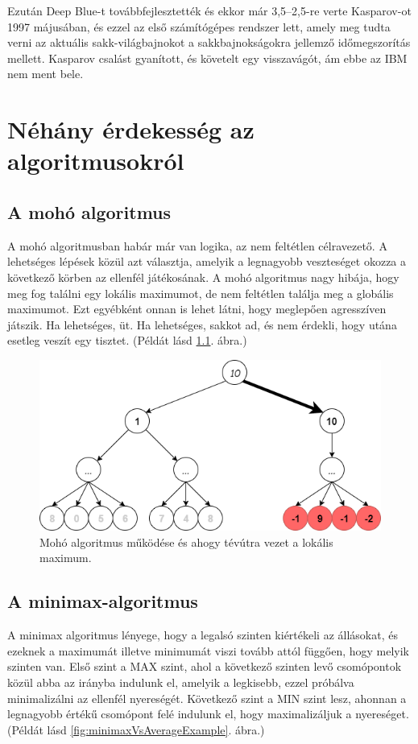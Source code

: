 \documentclass[twoside, a4paper, 12pt]{book}
\begin{document}
Ezután Deep Blue-t továbbfejlesztették és ekkor már 3,5–2,5-re verte Kasparov-ot 1997 májusában, és ezzel az első számítógépes rendszer lett, amely meg tudta verni az aktuális sakk-világbajnokot a sakkbajnokságokra jellemző időmegszorítás mellett. Kasparov csalást gyanított, és követelt egy visszavágót, ám ebbe az IBM nem ment bele. \cite{DeepBlueHu}\cite{DeepBlueEn}

\chapter{Néhány érdekesség az algoritmusokról}
\section{A mohó algoritmus}
A mohó algoritmusban habár már van logika, az nem feltétlen célravezető. A lehetséges lépések közül azt választja, amelyik a legnagyobb veszteséget okozza a következő körben az ellenfél játékosának. A mohó algoritmus nagy hibája, hogy meg fog találni egy lokális maximumot, de nem feltétlen találja meg a globális maximumot. Ezt egyébként onnan is lehet látni, hogy meglepően agresszíven játszik. Ha lehetséges, üt. Ha lehetséges, sakkot ad, és nem érdekli, hogy utána esetleg veszít egy tisztet.
(Példát lásd \ref{fig:greedyAlgorithmExampleDangerous}. ábra.)
\begin{figure}[htbp]
	\centering
	\includegraphics[width=\textwidth]{img/greedyAlgorithmExampleDangerous.png}
	\caption{Mohó algoritmus működése és ahogy tévútra vezet a lokális maximum.}
	\label{fig:greedyAlgorithmExampleDangerous}
\end{figure}

\section{A minimax-algoritmus}
A minimax algoritmus lényege, hogy a legalsó szinten kiértékeli az állásokat, és ezeknek a maximumát illetve minimumát viszi tovább attól függően, hogy melyik szinten van. Első szint a MAX szint, ahol a következő szinten levő csomópontok közül abba az irányba indulunk el, amelyik a legkisebb, ezzel próbálva minimalizálni az ellenfél nyereségét. Következő szint a MIN szint lesz, ahonnan a legnagyobb értékű csomópont felé indulunk el, hogy maximalizáljuk a nyereséget. (Példát lásd \ref{fig:minimaxVsAverageExample}. ábra.)\cite{bevMiHu}
\end{document}
